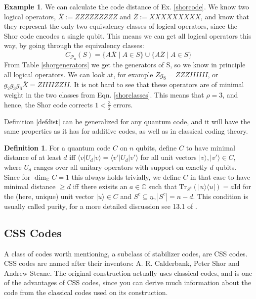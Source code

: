 \documentclass[12pt,a4paper,BCOR15mm,twoside,DIV12]{article}
\def\P{\mathcal{P}}
\def\C{\mathbb{C}}
\def\n{\underline{n}}
\def\Tr{\text{Tr}}
\def\Id{\text{Id}}
\theoremstyle{definition}
\newtheorem{ex}[Satz]{Example}
\newtheorem{defn}[Satz]{Definition}
\begin{document}
\begin{ex}
We can calculate the code distance of Ex. \ref{shorcode}. We know two logical operators, $\overline X := ZZZZZZZZZ$ and $\overline Z := XXXXXXXXX$, and know that they represent the only two equivalency classes of logical operators, since the Shor code encodes a single qubit.
This means we can get all logical operators this way, by going through the equivalency classes: \begin{equation}\label{shorclasses} C_{\P_n}(S) = \{ A \overline X \mid A \in S \} \cup \{ A \overline Z \mid A \in S \} \end{equation} From Table \ref{shorgenerators} we get the generators of S, so we know in principle all logical operators.
We can look at, for example $ \overline Z g_8 = ZZZIIIIII$, or $g_2 g_3 g_6 \overline X = ZIIIIZZII$. It is not hard to see that these operators are of minimal weight in the two classes from Eqn. \ref{shorclasses}. This means that $\rho = 3$, and hence, 
the Shor code corrects $1 < \frac{3}{2}$ errors. 
\end{ex}

Definition \ref{defdist} can be generalized for any quantum code, and it will have the same properties as it has for additive codes, as well as in classical coding theory. 
\begin{defn}\label{distgeneral}
For a quantum code $C$ on $n$ qubits, define $C$ to have minimal distance of at least $d$ iff $\langle v | U_d | v \rangle = \langle v' | U_d | v' \rangle$ for all unit vectors $|v \rangle, |v' \rangle \in C$, where $U_d$ ranges over all unitary operators with support on exactly $d$ qubits.
Since for $\dim_\C C = 1$ this always holds trivially, we define $C$ in that case to have minimal distance $\geq d$ iff there exisits an $a \in \C$ such that $\Tr_{S^c}(|u \rangle \langle u|) = a \Id$ for the (here, unique) unit vector $|u \rangle \in C$ and $S^c \subseteq \n, |S^c| = n - d$. This condition is usually called purity, for a more detailed discussion see 13.1 of \cite{nebe}.
\end{defn}

\subsection{CSS Codes}

A class of codes worth mentioning, a subclass of stabilizer codes, are CSS codes. CSS codes are named after their inventors: A. R. Calderbank, Peter Shor and Andrew Steane.
The original construction actually uses classical codes, and is one of the advantages of CSS codes, since you can derive much information about the code from the classical codes used on its construction. 
\end{document}
